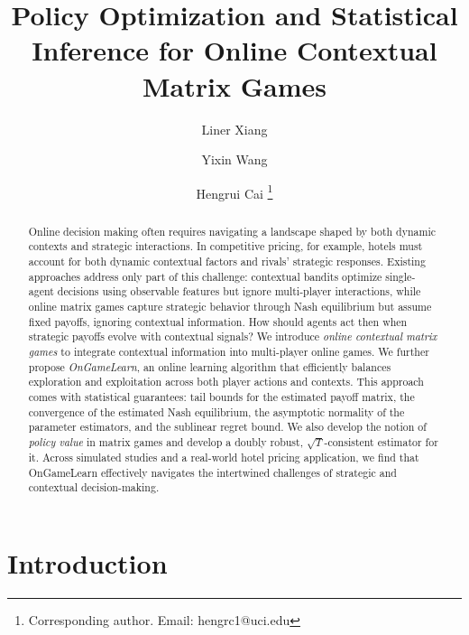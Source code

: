 \documentclass[12pt]{article}
\begin{document}
\def\spacingset#1{\renewcommand{\baselinestretch}%
{#1}\small\normalsize} \spacingset{1}
%
%
\title{\bf \LARGE Policy Optimization and Statistical Inference for Online Contextual Matrix Games}
\author[1]{Liner Xiang} 
\author[2]{Yixin Wang} 
\author[1]{Hengrui Cai \thanks{Corresponding author. Email: hengrc1@uci.edu}}
 \date{}
 \maketitle  

\baselineskip=21pt


\begin{abstract} 

Online decision making often requires navigating a landscape shaped by both dynamic contexts and strategic interactions. In competitive pricing, for example, hotels must account for both dynamic contextual factors and rivals' strategic responses. Existing approaches address only part of this challenge: contextual bandits optimize single-agent decisions using observable features but ignore multi-player interactions, while online matrix games capture strategic behavior through Nash equilibrium but assume fixed payoffs, ignoring contextual information. How should agents act then when strategic payoffs evolve with contextual signals?
We introduce \emph{online contextual matrix games} to integrate contextual information into multi-player online games. We further propose \emph{OnGameLearn}, an online learning algorithm that efficiently balances exploration and exploitation across both player actions and contexts. This approach comes with statistical guarantees: tail bounds for the estimated payoff matrix, the convergence of the estimated Nash equilibrium, the asymptotic normality of the parameter estimators, and the sublinear regret bound. We also develop the notion of \emph{policy value} in matrix games and develop a doubly robust, $\sqrt{T}$-consistent estimator for it. Across simulated studies and a real-world hotel pricing application, we find that OnGameLearn effectively navigates the intertwined challenges of strategic and contextual decision-making.

\end{abstract}


\section{Introduction}
\end{document}
